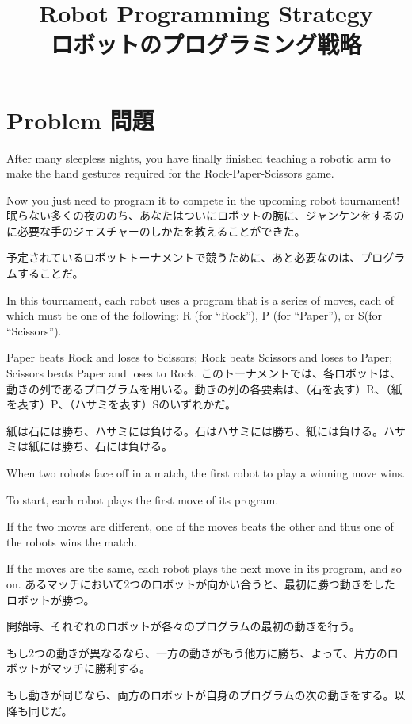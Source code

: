 \documentclass[uplatex,dvipdfmx]{jsarticle} \usepackage{amsmath,amssymb,bm}
\title{Robot Programming Strategy\\ロボットのプログラミング戦略} \author{} \date{}
\begin{document}
\maketitle
\section*{Problem 問題}
\begin{paracol}{2}
After many sleepless nights, you have finally finished teaching a robotic arm to make the hand gestures required for the Rock-Paper-Scissors game.

Now you just need to program it to compete in the upcoming robot tournament!
\switchcolumn
眠らない多くの夜ののち、あなたはついにロボットの腕に、ジャンケンをするのに必要な手のジェスチャーのしかたを教えることができた。

予定されているロボットトーナメントで競うために、あと必要なのは、プログラムすることだ。
\end{paracol}
\vspace{\baselineskip}
\begin{paracol}{2}
In this tournament, each robot uses a program that is a series of moves, each of which must be one of the following: R (for ``Rock''), P (for ``Paper''), or S(for ``Scissors'').

Paper beats Rock and loses to Scissors; Rock beats Scissors and loses to Paper; Scissors beats Paper and loses to Rock.
\switchcolumn
このトーナメントでは、各ロボットは、動きの列であるプログラムを用いる。動きの列の各要素は、（石を表す）R、（紙を表す）P、（ハサミを表す）Sのいずれかだ。

紙は石には勝ち、ハサミには負ける。石はハサミには勝ち、紙には負ける。ハサミは紙には勝ち、石には負ける。
\end{paracol}
\vspace{\baselineskip}
\begin{paracol}{2}
When two robots face off in a match, the first robot to play a winning move wins.

To start, each robot plays the first move of its program.

If the two moves are different, one of the moves beats the other and thus one of the robots wins the match.

If the moves are the same, each robot plays the next move in its program, and so on.
\switchcolumn
あるマッチにおいて2つのロボットが向かい合うと、最初に勝つ動きをしたロボットが勝つ。

開始時、それぞれのロボットが各々のプログラムの最初の動きを行う。

もし2つの動きが異なるなら、一方の動きがもう他方に勝ち、よって、片方のロボットがマッチに勝利する。

もし動きが同じなら、両方のロボットが自身のプログラムの次の動きをする。以降も同じだ。
\end{paracol}
\end{document}

